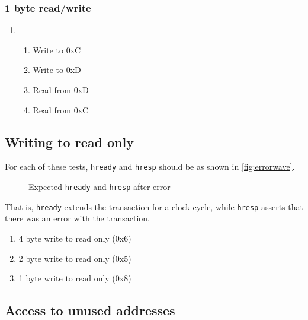 \documentclass{scrartcl}
\begin{document}
\subsubsection{1 byte read/write}
\begin{enumerate}
    \item
    \begin{enumerate}
        \item Write to 0xC
        \item Write to 0xD
        \item Read from 0xD
        \item Read from 0xC
    \end{enumerate}
\end{enumerate}

\subsection{Writing to read only}
For each of these tests, \texttt{hready} and \texttt{hresp} should be as shown in \autoref{fig:errorwave}.
\begin{figure}
    \begin{center}
    \end{center}
    \caption{Expected \texttt{hready} and \texttt{hresp} after error}
    \label{fig:errorwave}
\end{figure}
That is, \texttt{hready} extends the transaction for a clock cycle, while \texttt{hresp} asserts that there was an error with the transaction.

\begin{enumerate}
    \item 4 byte write to read only (0x6)
    \item 2 byte write to read only (0x5)
    \item 1 byte write to read only (0x8)
\end{enumerate}

\subsection{Access to unused addresses}
\end{document}
